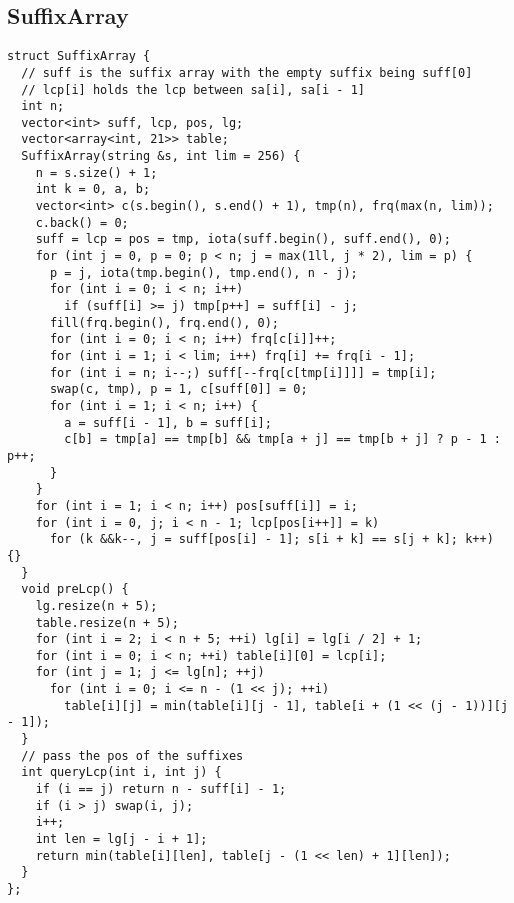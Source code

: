 \documentclass[twoside]{article}
\begin{document}
\begin{multicols*}{2}
{\subsection*{SuffixArray}
}
\begin{verbatim}
struct SuffixArray {
  // suff is the suffix array with the empty suffix being suff[0]
  // lcp[i] holds the lcp between sa[i], sa[i - 1]
  int n;
  vector<int> suff, lcp, pos, lg;
  vector<array<int, 21>> table;
  SuffixArray(string &s, int lim = 256) {
    n = s.size() + 1;
    int k = 0, a, b;
    vector<int> c(s.begin(), s.end() + 1), tmp(n), frq(max(n, lim));
    c.back() = 0;
    suff = lcp = pos = tmp, iota(suff.begin(), suff.end(), 0);
    for (int j = 0, p = 0; p < n; j = max(1ll, j * 2), lim = p) {
      p = j, iota(tmp.begin(), tmp.end(), n - j);
      for (int i = 0; i < n; i++)
        if (suff[i] >= j) tmp[p++] = suff[i] - j;
      fill(frq.begin(), frq.end(), 0);
      for (int i = 0; i < n; i++) frq[c[i]]++;
      for (int i = 1; i < lim; i++) frq[i] += frq[i - 1];
      for (int i = n; i--;) suff[--frq[c[tmp[i]]]] = tmp[i];
      swap(c, tmp), p = 1, c[suff[0]] = 0;
      for (int i = 1; i < n; i++) {
        a = suff[i - 1], b = suff[i];
        c[b] = tmp[a] == tmp[b] && tmp[a + j] == tmp[b + j] ? p - 1 : p++;
      }
    }
    for (int i = 1; i < n; i++) pos[suff[i]] = i;
    for (int i = 0, j; i < n - 1; lcp[pos[i++]] = k)
      for (k &&k--, j = suff[pos[i] - 1]; s[i + k] == s[j + k]; k++) {}
  }
  void preLcp() {
    lg.resize(n + 5);
    table.resize(n + 5);
    for (int i = 2; i < n + 5; ++i) lg[i] = lg[i / 2] + 1;
    for (int i = 0; i < n; ++i) table[i][0] = lcp[i];
    for (int j = 1; j <= lg[n]; ++j)
      for (int i = 0; i <= n - (1 << j); ++i)
        table[i][j] = min(table[i][j - 1], table[i + (1 << (j - 1))][j - 1]);
  }
  // pass the pos of the suffixes
  int queryLcp(int i, int j) {
    if (i == j) return n - suff[i] - 1;
    if (i > j) swap(i, j);
    i++;
    int len = lg[j - i + 1];
    return min(table[i][len], table[j - (1 << len) + 1][len]);
  }
};
\end{verbatim}

{
}
\end{multicols*}
\end{document}
